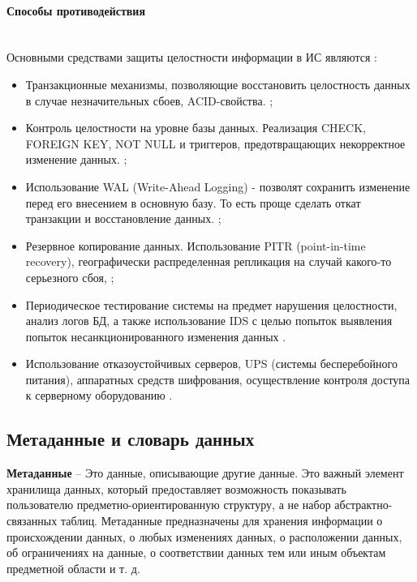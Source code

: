 \paragraph{Способы противодействия} ~\\

Основными средствами защиты целостности информации в ИС являются \autocite{Pirogov2009}:

\begin{itemize}
    \item Транзакционные механизмы, позволяющие восстановить целостность данных в случае незначительных сбоев, ACID-свойства. \autocite{worksol1, DBtest};
    \item Контроль целостности на уровне базы данных. Реализация CHECK, FOREIGN KEY, NOT NULL и триггеров, предотвращающих некорректное изменение данных. \autocite{flenovinfo};
    \item Использование WAL (Write-Ahead Logging) - позволят сохранить изменение перед его внесением в основную базу. То есть проще сделать откат транзакции и восстановление данных. \autocite{WALintro};
    \item Резервное копирование данных. Использование PITR (point-in-time recovery), географически распределенная репликация на случай какого-то серьезного сбоя, \autocite{PITRintro};
    \item Периодическое тестирование системы на предмет нарушения целостности, анализ логов БД, а также использование IDS с целью попыток выявления попыток несанкционированного изменения данных \autocite{DBtest}.
    \item Использование отказоустойчивых серверов, UPS (системы бесперебойного питания), аппаратных средств шифрования, осуществление контроля доступа к серверному оборудованию \autocite{tolerance1, tolerance2}.

\end{itemize}

\subsection{Метаданные и словарь данных}

\begin{grayquote}
	\textbf{Метаданные} -- Это данные, описывающие другие данные. Это важный элемент хранилища данных, который предоставляет возможность показывать пользователю предметно-ориентированную структуру, а не набор абстрактно-связанных таблиц. Метаданные предназначены для хранения информации о происхождении данных, о любых изменениях данных, о расположении данных, об ограничениях на данные, о соответствии данных тем или иным объектам предметной области и т. д. \autocite{Pirogov2009}
\end{grayquote}

